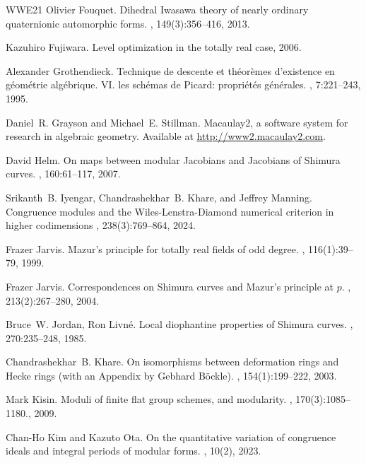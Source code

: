 \documentclass[a4paper, notitlepage, 10pt]{amsart}
\theoremstyle{plain} %
\theoremstyle{definition} %
\theoremstyle{remark} %
\numberwithin{equation}{section}
\begin{document}
\begin{thebibliography}{WWE21}
Olivier Fouquet.
\newblock Dihedral {Iwasawa} theory of nearly ordinary quaternionic automorphic forms.
, 149(3):356--416, 2013.

Kazuhiro Fujiwara.
\newblock Level optimization in the totally real case, 2006.

Alexander Grothendieck.
\newblock Technique de descente et théorèmes d'existence en géométrie algébrique. {VI}. les schémas de {P}icard: propriétés générales.
, 7:221--243, 1995.

Daniel~R. Grayson and Michael~E. Stillman.
\newblock Macaulay2, a software system for research in algebraic geometry.
\newblock Available at \url{http://www2.macaulay2.com}.

David Helm.
\newblock On maps between modular {Jacobians} and {Jacobians} of {Shimura} curves.
, 160:61--117, 2007.


Srikanth~B. Iyengar, Chandrashekhar~B. Khare, and Jeffrey Manning.
\newblock  Congruence modules and the {Wiles-Lenstra-Diamond} numerical criterion in higher codimensions
, 238(3):769--864, 2024.

Frazer Jarvis.
\newblock Mazur's principle for totally real fields of odd degree.
, 116(1):39--79, 1999.

Frazer Jarvis.
\newblock Correspondences on {Shimura} curves and {Mazur}'s principle at {{\(p\)}}.
, 213(2):267--280, 2004.

Bruce~W. Jordan, Ron Livné.
\newblock Local diophantine properties of {Shimura} curves.
, 270:235--248, 1985.

Chandrashekhar~B. Khare.
\newblock On isomorphisms between deformation rings and {Hecke} rings (with an {Appendix} by {Gebhard} {Böckle}).
, 154(1):199--222, 2003.

Mark Kisin.
\newblock Moduli of finite flat group schemes, and modularity.
, 170(3):1085--1180., 2009.

Chan-Ho Kim and Kazuto Ota.
\newblock On the quantitative variation of congruence ideals and integral periods of modular forms.
, 10(2), 2023.


\end{thebibliography}
\end{document}

